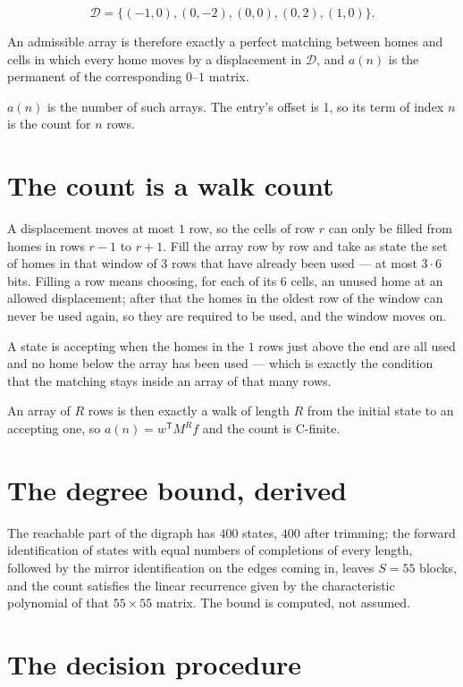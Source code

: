 \documentclass[11pt]{article}
\theoremstyle{definition}
\begin{document}
\[\mathcal{D} = \{(-1,0), (0,-2), (0,0), (0,2), (1,0)\}.\]

An admissible array is therefore exactly a perfect matching between homes and cells in which every home moves by a displacement in $\mathcal{D}$, and $a(n)$ is the permanent of the corresponding $0$--$1$ matrix.

$a(n)$ is the number of such arrays. The entry's offset is 1, so its term of index $n$ is the count for $n$ rows.

\section{The count is a walk count}

A displacement moves at most $1$ row, so the cells of row $r$ can only be filled from homes in rows $r-1$ to $r+1$. Fill the array row by row and take as state the set of homes in that window of $3$ rows that have already been used --- at most $3\cdot6$ bits. Filling a row means choosing, for each of its $6$ cells, an unused home at an allowed displacement; after that the homes in the oldest row of the window can never be used again, so they are required to be used, and the window moves on.

A state is accepting when the homes in the $1$ rows just above the end are all used and no home below the array has been used --- which is exactly the condition that the matching stays inside an array of that many rows.

An array of $R$ rows is then exactly a walk of length $R$ from the initial state to an accepting one, so $a(n) = w^{\mathsf T}M^{R}f$ and the count is C-finite.

\section{The degree bound, derived}

The reachable part of the digraph has $400$ states, $400$ after trimming; the forward identification of states with equal numbers of completions of every length, followed by the mirror identification on the edges coming in, leaves $S = 55$ blocks, and the count satisfies the linear recurrence given by the characteristic polynomial of that $55\times55$ matrix. The bound is computed, not assumed.

\section{The decision procedure}
\end{document}
